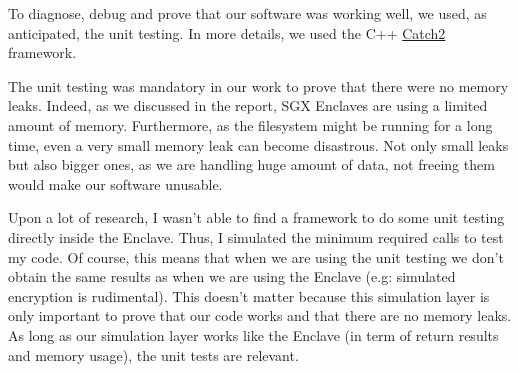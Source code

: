 \documentclass[../main.tex]{subfiles}
\begin{document}
\par To diagnose, debug and prove that our software was working well, we used, as anticipated, the unit testing. In more details, we used the C++ \href{https://github.com/catchorg/Catch2}{Catch2} framework.
\par The unit testing was mandatory in our work to prove that there were no memory leaks. Indeed, as we discussed in the report, SGX Enclaves are using a limited amount of memory. Furthermore, as the filesystem might be running for a long time, even a very small memory leak can become disastrous. Not only small leaks but also bigger ones, as we are handling huge amount of data, not freeing them would make our software unusable.
\par Upon a lot of research, I wasn't able to find a framework to do some unit testing directly inside the Enclave. Thus, I simulated the minimum required calls to test my code. Of course, this means that when we are using the unit testing we don't obtain the same results as when we are using the Enclave (e.g: simulated encryption is rudimental). This doesn't matter because this simulation layer is only important to prove that our code works and that there are no memory leaks. As long as our simulation layer works like the Enclave (in term of return results and memory usage), the unit tests are relevant.
\end{document}
